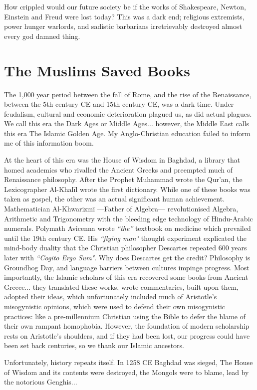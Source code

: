 How crippled would our future society be if the works of Shakespeare, Newton, Einstein and Freud were lost today? This was a dark end; religious extremists, power hunger warlords, and sadistic barbarians irretrievably destroyed almost every god damned thing.

\section{The Muslims Saved Books}

The 1,000 year period between the fall of Rome, and the rise of the Renaissance, between the 5th century CE and 15th century CE, was a dark time. Under feudalism, cultural and economic deterioration plagued us, as did actual plagues. We call this era the Dark Ages or Middle Ages... however, the Middle East calls this era The Islamic Golden Age. My Anglo-Christian education failed to inform me of this information boom. 

At the heart of this era was the House of Wisdom in Baghdad, a library that homed academics who rivalled the Ancient Greeks and preempted much of Renaissance philosophy. After the Prophet Muhammad wrote the Qur'an, the Lexicographer Al-Khalīl wrote the first dictionary. While one of these books was taken as gospel, the other was an actual significant human achievement. Mathematician Al-Khwarizmī ---Father of Algebra--- revolutionised Algebra, Arithmetic and Trigonometry with the bleeding edge technology of Hindu-Arabic numerals. Polymath Avicenna wrote \textit{``the''} textbook on medicine which prevailed until the 19th century CE. His \textit{``flying man"} thought experiment explicated the mind-body duality that the Christian philosopher Descartes repeated 600 years later with \textit{``Cogito Ergo Sum"}. Why does Descartes get the credit? Philosophy is Groundhog Day, and language barriers between cultures impinge progress. Most importantly, the Islamic scholars of this era recovered some books from Ancient Greece... they translated these works, wrote commentaries, built upon them, adopted their ideas, which unfortunately included much of Aristotle's misogynistic opinions, which were used to defend their own misogynistic practices: like a pre-millennium Christian using the Bible to defer the blame of their own rampant homophobia. However, the foundation of modern scholarship rests on Aristotle's shoulders, and if they had been lost, our progress could have been set back centuries, so we thank our Islamic ancestors. 

Unfortunately, history repeats itself. In 1258 CE Baghdad was sieged, The House of Wisdom and its contents were destroyed, the Mongols were to blame, lead by the notorious Genghis...

